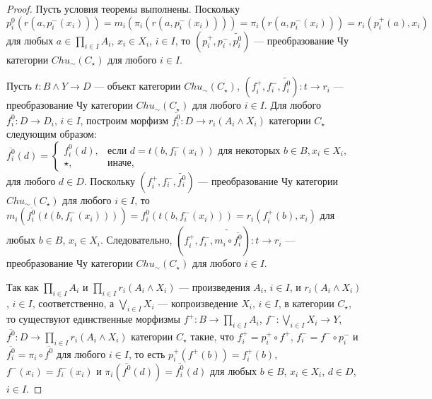 \documentclass[a4paper,12pt]{article}
\begin{document}
\begin{proof}
    Пусть условия теоремы выполнены. Поскольку $p^0_i(r(a,p^-_i(x_i))) = m_i(\pi_i(r(a,p^-_i(x_i)))) = \pi_i(r(a,p^-_i(x_i))) = r_i(p^+_i(a),x_i)$ для любых $a \in \prod_{i \in I} A_i$, $x_i \in X_i$, $i \in I$, то $(p^+_i,p^-_i,\widetilde{p^0_i})$ --- преобразование Чу категории $Chu_\sim(C_\star)$ для любого $i \in I$.

    Пусть $t: B \wedge Y \to D$ --- объект категории $Chu_\sim(C_\star)$, $(f^+_i,f^-_i,\widetilde{f^0_i}): t \to r_i$ --- преобразование Чу категории $Chu_\sim(C_\star)$ для любого $i \in I$. Для любого $f^0_i: D \to D_i$, $i \in I$, построим морфизм $\overline{f^0_i}: D \to r_i(A_i \wedge X_i)$ категории $C_\star$ следующим образом: $\overline{f^0_i}(d) = 
    \begin{cases}
        f^0_i(d),& \text{если } d = t(b,f^-_i(x_i)) \text{ для некоторых } b \in B, x_i \in X_i,\\
        \star,& \text{иначе},
    \end{cases}$
    для любого $d \in D$. Поскольку $(f^+_i,f^-_i,\widetilde{f^0_i})$ --- преобразование Чу категории $Chu_\sim(C_\star)$ для любого $i \in I$, то $m_i(\overline{f^0_i}(t(b,f^-_i(x_i)))) = f^0_i(t(b,f^-_i(x_i))) = r_i(f^+_i(b),x_i)$ для любых $b \in B$, $x_i \in X_i$. Следовательно, $(f^+_i,f^-_i,\widetilde{m_i \circ \overline{f^0_i}}): t \to r_i$ --- преобразование Чу категории $Chu_\sim(C_\star)$ для любого $i \in I$.

    Так как $\prod_{i \in I} A_i$ и $\prod_{i \in I} r_i(A_i \wedge X_i)$ --- произведения $A_i$, $ i \in I$, и $r_i(A_i \wedge X_i)$, $i \in I$, соответственно, а $\bigvee_{i \in I} X_i$ --- копроизведение $X_i$, $i \in I$, в категории $C_\star$, то существуют единственные морфизмы $f^+: B \to \prod_{i \in I} A_i$, $f^-: \bigvee_{i \in I} X_i \to Y$, $\overline{f^0}: D \to \prod_{i \in I} r_i(A_i \wedge X_i)$ категории $C_\star$ такие, что $f^+_i = p^+_i \circ f^+$, $f^-_i = f^- \circ p^-_i$ и $\overline{f^0_i} = \pi_i \circ \overline{f^0}$ для любого $i \in I$, то есть $p^+_i(f^+(b)) = f^+_i(b)$, $f^-(x_i) = f^-_i(x_i)$ и $\pi_i(\overline{f^0}(d)) = \overline{f^0_i}(d)$ для любых $b \in  B$, $x_i \in X_i$, $d \in D$, $i \in I$.


\end{proof}
\end{document}

